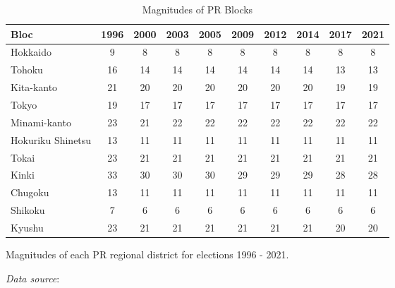 \begin{table}[!htbp]
\begin{threeparttable}
\begin{tabular}{lccccccccc}
\toprule
Bloc & 1996 & 2000 & 2003 & 2005 & 2009 & 2012 & 2014 & 2017 & 2021 \\
\midrule
Hokkaido & 9 & 8 & 8 & 8 & 8 & 8 & 8 & 8 & 8 \\
Tohoku & 16 & 14 & 14 & 14 & 14 & 14 & 14 & 13 & 13 \\
Kita-kanto & 21 & 20 & 20 & 20 & 20 & 20 & 20 & 19 & 19 \\
Tokyo & 19 & 17 & 17 & 17 & 17 & 17 & 17 & 17 & 17 \\
Minami-kanto & 23 & 21 & 22 & 22 & 22 & 22 & 22 & 22 & 22 \\
Hokuriku Shinetsu & 13 & 11 & 11 & 11 & 11 & 11 & 11 & 11 & 11 \\
Tokai & 23 & 21 & 21 & 21 & 21 & 21 & 21 & 21 & 21 \\
Kinki & 33 & 30 & 30 & 30 & 29 & 29 & 29 & 28 & 28 \\
Chugoku & 13 & 11 & 11 & 11 & 11 & 11 & 11 & 11 & 11 \\
Shikoku & 7 & 6 & 6 & 6 & 6 & 6 & 6 & 6 & 6 \\
Kyushu & 23 & 21 & 21 & 21 & 21 & 21 & 21 & 20 & 20 \\
\bottomrule
\end{tabular}
\begin{tablenotes}[flushleft]
  \scriptsize{
    \item Magnitudes of each PR regional district for elections 1996 - 2021. 
    \item \textit{Data source}: \citet{reedReedSmithJapaneseHouse2017, ministryofinternalaffairsandcommunicationsElectionSenkyo2024}
  }
\end{tablenotes}
\end{threeparttable}
\caption{Magnitudes of PR Blocks}
\label{tab:distM}
\end{table}